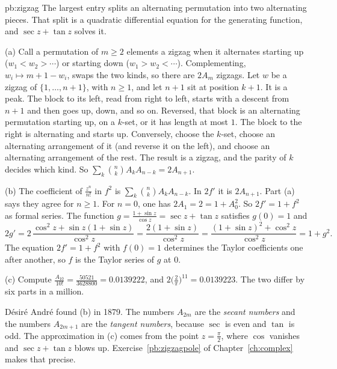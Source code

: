 \begin{solution}{pb:zigzag}
\idea The largest entry splits an alternating permutation into two alternating pieces. That split is a quadratic differential equation for the generating function, and $\sec z+\tan z$ solves it.

\writeup (a) Call a permutation of $m\ge2$ elements a zigzag when it alternates starting up ($w_1<w_2>\cdots$) or starting down ($w_1>w_2<\cdots$). Complementing,
$w_i\mapsto m+1-w_i$, swaps the two kinds, so there are $2A_m$ zigzags. Let $w$ be a zigzag of $\{1,\dots,n+1\}$, with $n\ge1$, and let $n+1$ sit at position $k+1$. It is a peak. The
block to its left, read from right to left, starts with a descent from $n+1$ and then goes up, down, and so on. Reversed, that block is an alternating permutation
starting up, on a $k$-set, or it has length at most $1$. The block to the right is alternating and starts up. Conversely, choose the $k$-set, choose an alternating
arrangement of it (and reverse it on the left), and choose an alternating arrangement of the rest. The result is a zigzag, and the parity of $k$ decides which kind. So
$\sum_k\binom nkA_kA_{n-k}=2A_{n+1}$.

(b) The coefficient of $\frac{z^n}{n!}$ in $f^2$ is $\sum_k\binom nkA_kA_{n-k}$. In $2f'$ it is $2A_{n+1}$. Part (a) says they agree for $n\ge1$. For $n=0$, one has $2A_1=2=1+A_0^2$. So $2f'=1+f^2$
as formal series. The function $g=\frac{1+\sin z}{\cos z}=\sec z+\tan z$ satisfies $g(0)=1$ and
\[
2g'=2\,\frac{\cos^2z+\sin z(1+\sin z)}{\cos^2z}=\frac{2(1+\sin z)}{\cos^2z}=\frac{(1+\sin z)^2+\cos^2z}{\cos^2z}=1+g^2.
\]
The equation $2f'=1+f^2$ with $f(0)=1$ determines the Taylor coefficients one after another, so $f$ is the Taylor series of $g$ at $0$.

(c) Compute $\frac{A_{10}}{10!}=\frac{50521}{3628800}=0.0139222$, and $2\bigl(\frac2\pi\bigr)^{11}=0.0139223$. The two differ by six parts in a million.

\leads D\'esir\'e Andr\'e found (b) in 1879. The numbers $A_{2m}$ are the \emph{secant numbers} and the numbers $A_{2m+1}$ are the \emph{tangent numbers}, because $\sec$ is even and $\tan$ is
odd. The approximation in (c) comes from the point $z=\frac\pi2$, where $\cos$ vanishes and $\sec z+\tan z$ blows up. Exercise~\ref{pb:zigzagpole} of
Chapter~\ref{ch:complex} makes that precise.
\end{solution}

